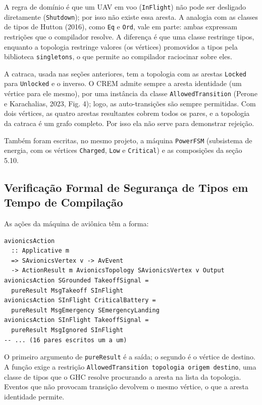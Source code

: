 \documentclass[12pt,a4paper]{article}
\begin{document}
A regra de domínio é que um UAV em voo (\texttt{InFlight}) não pode ser desligado diretamente (\texttt{Shutdown}); por isso não existe essa aresta. A analogia com as classes de tipos de Hutton (2016), como \texttt{Eq} e \texttt{Ord}, vale em parte: ambas expressam restrições que o compilador resolve. A diferença é que uma classe restringe tipos, enquanto a topologia restringe valores (os vértices) promovidos a tipos pela biblioteca \texttt{singletons}, o que permite ao compilador raciocinar sobre eles.

A catraca, usada nas seções anteriores, tem a topologia com as arestas \texttt{Locked} para \texttt{Unlocked} e o inverso. O CREM admite sempre a aresta identidade (um vértice para ele mesmo), por uma instância da classe \texttt{AllowedTransition} (Perone e Karachalias, 2023, Fig. 4); logo, as auto-transições são sempre permitidas. Com dois vértices, as quatro arestas resultantes cobrem todos os pares, e a topologia da catraca é um grafo completo. Por isso ela não serve para demonstrar rejeição.

Também foram escritas, no mesmo projeto, a máquina \texttt{PowerFSM} (subsistema de energia, com os vértices \texttt{Charged}, \texttt{Low} e \texttt{Critical}) e as composições da seção 5.10.

\subsection{Verificação Formal de Segurança de Tipos em Tempo de Compilação}

As ações da máquina de aviônica têm a forma:

\begin{verbatim}
avionicsAction
  :: Applicative m
  => SAvionicsVertex v -> AvEvent
  -> ActionResult m AvionicsTopology SAvionicsVertex v Output
avionicsAction SGrounded TakeoffSignal =
  pureResult MsgTakeoff SInFlight
avionicsAction SInFlight CriticalBattery =
  pureResult MsgEmergency SEmergencyLanding
avionicsAction SInFlight TakeoffSignal =
  pureResult MsgIgnored SInFlight
-- ... (16 pares escritos um a um)
\end{verbatim}

O primeiro argumento de \texttt{pureResult} é a saída; o segundo é o vértice de destino. A função exige a restrição \texttt{AllowedTransition topologia origem destino}, uma classe de tipos que o GHC resolve procurando a aresta na lista da topologia. Eventos que não provocam transição devolvem o mesmo vértice, o que a aresta identidade permite.
\end{document}
